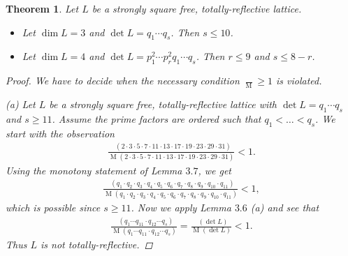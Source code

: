 \documentclass{amsart}
\newtheorem{thm}{Theorem}[section]
\theoremstyle{definition}
\theoremstyle{remark}
\DeclareMathOperator{\M}{M}
\DeclareMathOperator{\Mref}{M_{ref}}
\begin{document}
\begin{thm}
 Let $L$ be a strongly square free, totally-reflective lattice.
\begin{itemize}
 \item[(a)] Let $\dim L=3$ and $\det L =q_1 \cdots q_s$. Then $s \leq 10$.
 \item[(b)] Let $\dim L=4$ and $\det L =p_1^2 \cdots p_r^2 q_1 \cdots q_s$. Then $r \leq 9$ and $s \leq 8-r$.
\end{itemize}
 \begin{proof}
 We have to decide when the necessary condition $\frac{\Mref}{\M} \geq 1 $ is violated.

 (a) Let $L$ be a strongly square free, totally-reflective lattice with $\det L = q_1 \cdots q_s$ and $s \geq 11$. Assume the prime factors are ordered such that $q_1 < \dots < q_s$.
 We start with the observation
 \begin{align*}
  \frac{\Mref(2 \cdot 3 \cdot 5 \cdot 7 \cdot 11 \cdot 13 \cdot 17 \cdot 19 \cdot 23 \cdot 29 \cdot 31)}{\M(2 \cdot 3 \cdot 5 \cdot 7 \cdot 11 \cdot 13 \cdot 17 \cdot 19 \cdot 23 \cdot 29 \cdot 31)} < 1.
 \end{align*}
 Using the monotony statement of Lemma $3.7$, we get
 \begin{align*}
  \frac{\Mref(q_1 \cdot q_2 \cdot q_3 \cdot q_4 \cdot q_5 \cdot q_6 \cdot q_7 \cdot q_8 \cdot q_9 \cdot q_{10} \cdot q_{11})}
       {\M(q_1 \cdot q_2 \cdot q_3 \cdot q_4 \cdot q_5 \cdot q_6 \cdot q_7 \cdot q_8 \cdot q_9\cdot q_{10} \cdot q_{11})} < 1,
 \end{align*}
 which is possible since $s \geq 11$. Now we apply Lemma $3.6$ (a) and see that
  \begin{align*}
  \frac{\Mref(q_1 \cdots q_{11} \cdot q_{12} \cdots q_s)}{\M(q_1 \cdots q_{11} \cdot q_{12} \cdots q_s)} = \frac{\Mref(\det L)}{\M(\det L)} < 1.
 \end{align*}
 Thus $L$ is not totally-reflective.


\end{proof}
\end{thm}
\end{document}
